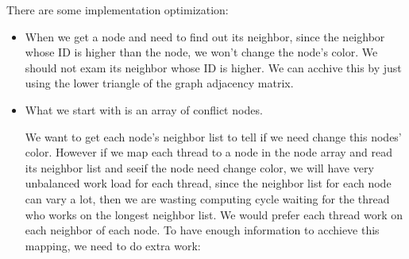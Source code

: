 \documentclass[12pt] {article}
\begin{document}
There are some implementation optimization:
\begin{itemize}
\item When we get a node and need to find out its neighbor, since the neighbor whose ID is higher than the node, we won't change the node's color. We should not exam its neighbor whose ID is higher. We can acchive this by just using the lower triangle of the graph adjacency matrix. 

\item What we start with is an array of conflict nodes.

\begin{figure}[!tbh]
\centering        
   \caption{ }
   \label{fig:fig3}
\end{figure} 

We want to get each node's neighbor list to tell if we need change this nodes' color. However if we map each thread to a node in the node array and read its neighbor list and seeif the node need change color, we will have very unbalanced work load for each thread, since the neighbor list for each node can vary a lot, then we are wasting computing cycle waiting for the thread who works on the longest neighbor list. We would prefer each thread work on each neighbor of each node. To have enough information to acchieve this mapping, we need to do extra work:
\begin{figure}[!tbh]
\centering        
   \caption{ }
   \label{fig:fig4}
\end{figure} 


\end{itemize}
\end{document}
